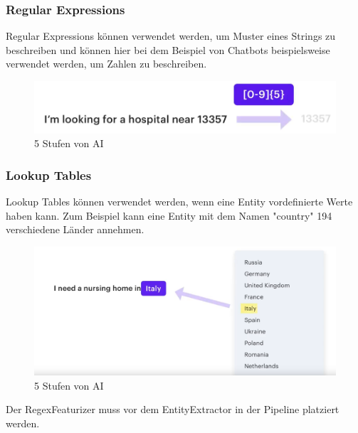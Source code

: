 \subsubsection{Regular Expressions}

Regular Expressions können verwendet werden, um Muster eines Strings zu beschreiben und können hier bei dem Beispiel von Chatbots beispielsweise verwendet werden, um Zahlen zu beschreiben.\cite{rasaMasterclassRegexFeaturizer, pipelineComponentsYoutube, regexFeaturizerCrf}

\begin{figure}
  \centering
  \includegraphics[scale=0.25]{pics/regular-expression-example}
  \caption{5 Stufen von AI~\cite{pipelineComponentsYoutube}}
  \label{fig:Regular Expression Beispiel}
\end{figure}

\subsubsection{Lookup Tables}

Lookup Tables können verwendet werden, wenn eine Entity vordefinierte Werte haben kann.
Zum Beispiel kann eine Entity mit dem Namen "country" 194 verschiedene Länder annehmen.\cite{rasaMasterclassRegexFeaturizer, pipelineComponentsYoutube, regexFeaturizerCrf}

\begin{figure}
  \centering
  \includegraphics[scale=0.25]{pics/lookup-table-example}
  \caption{5 Stufen von AI~\cite{pipelineComponentsYoutube}}
  \label{fig:Lookup Table Beispiel}
\end{figure}

Der RegexFeaturizer muss vor dem EntityExtractor in der Pipeline platziert werden.\cite{rasaMasterclassRegexFeaturizer, pipelineComponentsYoutube, regexFeaturizerCrf}

